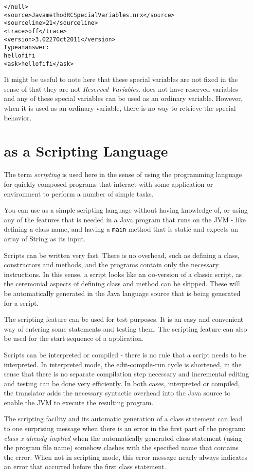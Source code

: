 {\begin{alltt}
</null>
<source>Java method RCSpecialVariables.nrx</source>
<sourceline>21</sourceline>
<trace>off</trace>
<version>\nr{} 3.02 27 Oct 2011</version>
Type an answer:
hello fifi
<ask>hello fifi</ask>
\end{alltt}
It might be useful to note here that these special variables are not
fixed in the sense of that they are not \emph{Reserved Variables}. \nr{}
does not have reserved variables and any of these special variables
can be used as an ordinary variable. However, when it is used as an
ordinary variable, there is no way to retrieve the special behavior.

\chapter{\nr{} as a Scripting Language}
The term \emph{scripting} is used here in the sense of using the
programming language for quickly composed programs that interact with
some application or environment to perform a number of simple tasks.

You can use \nr{} as a simple scripting language without having
knowledge of, or using any of the features that is needed in a Java
program that runs on the JVM - like defining a class name, and having
a \texttt{main} method that is static and expects an array of String
as its input. 

Scripts can be written very fast. There is
no overhead, such as defining a class, constructors and methods, and the programs contain only
the necessary instructions. In this sense, a \nr{} script looks like
an oo-version of a classic script, as the ceremonial aspects of defining
class and method can be skipped. These will be automatically generated
in the Java language source that is being generated for a script.

The scripting feature can be used for test purposes. It is an easy and convenient way of entering some statements and testing them.
The scripting feature can also be used for the start sequence of a \nr{} application.

Scripts can be interpreted or compiled - there is no rule that a
script needs to be interpreted. In interpreted mode, the
edit-compile-run cycle is shortened, in the sense that there is no separate compilation
step necessary and incremental editing and testing can be done very efficiently. In both cases, interpreted or
compiled, the \nr{} translator adds the necessary syntactic overhead
into the Java source to enable
the JVM to execute the resulting program.
\begin{shaded}
The scripting facility and its automatic generation of a class
statement can lead to one surprising message when there is
an error in the first part of the program: \emph{class x already
  implied} when the automatically generated class statement (using the
program file name) somehow clashes with the specified name that
contains the error. When not in scripting mode, this error message
nearly always indicates an error that occurred before the first class statement.
\end{shaded}
}
